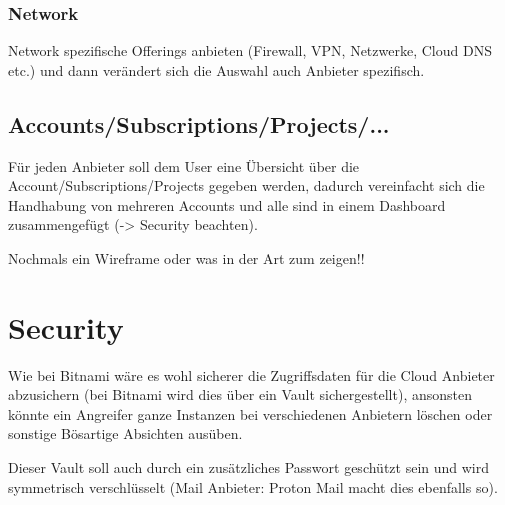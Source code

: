 \documentclass[11pt]{scrartcl}
\begin{document}
\subsubsection{Network}
Network spezifische Offerings anbieten (Firewall, VPN, Netzwerke, Cloud DNS etc.) 
und dann verändert sich die Auswahl auch Anbieter spezifisch.




\subsection{Accounts/Subscriptions/Projects/...}
Für jeden Anbieter soll dem User eine Übersicht über die 
Account/Subscriptions/Projects gegeben werden, dadurch vereinfacht sich die 
Handhabung von mehreren Accounts und alle sind in einem Dashboard zusammengefügt 
(-> Security beachten).

Nochmals ein Wireframe oder was in der Art zum zeigen!!



\section{Security}
Wie bei Bitnami wäre es wohl sicherer die Zugriffsdaten für die Cloud Anbieter 
abzusichern (bei Bitnami wird dies über ein Vault sichergestellt), ansonsten 
könnte ein Angreifer ganze Instanzen bei verschiedenen Anbietern löschen oder 
sonstige Bösartige Absichten ausüben.

Dieser Vault soll auch durch ein zusätzliches Passwort geschützt sein und 
wird symmetrisch verschlüsselt (Mail Anbieter: Proton Mail macht dies ebenfalls 
so).
\end{document}
